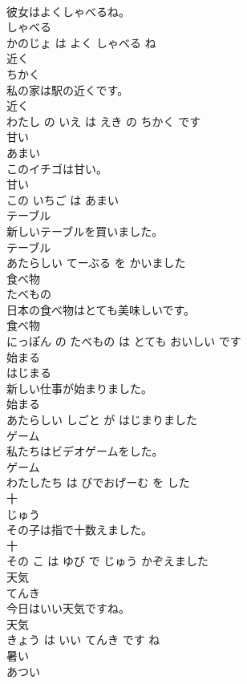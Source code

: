 \documentclass[8pt]{extreport}
\begin{document}
\begin{CJK}{UTF8}{min}
\\	彼女はよくしゃべるね。	
\\	しゃべる 
\\	かのじょ は よく しゃべる ね			
\\	近く	
\\	ちかく			
\\	私の家は駅の近くです。	
\\	近く 
\\	わたし の いえ は えき の ちかく です			
\\	甘い	
\\	あまい			
\\	このイチゴは甘い。	
\\	甘い 
\\	この いちご は あまい			
\\	テーブル	
\\	新しいテーブルを買いました。	
\\	テーブル 
\\	あたらしい てーぶる を かいました			
\\	食べ物	
\\	たべもの			
\\	日本の食べ物はとても美味しいです。	
\\	食べ物 
\\	にっぽん の たべもの は とても おいしい です			
\\	始まる	
\\	はじまる			
\\	新しい仕事が始まりました。	
\\	始まる 
\\	あたらしい しごと が はじまりました			
\\	ゲーム	
\\	私たちはビデオゲームをした。	
\\	ゲーム 
\\	わたしたち は びでおげーむ を した			
\\	十	
\\	じゅう			
\\	その子は指で十数えました。	
\\	十 
\\	その こ は ゆび で じゅう かぞえました			
\\	天気	
\\	てんき			
\\	今日はいい天気ですね。	
\\	天気 
\\	きょう は いい てんき です ね			
\\	暑い	
\\	あつい			

\end{CJK}
\end{document}
